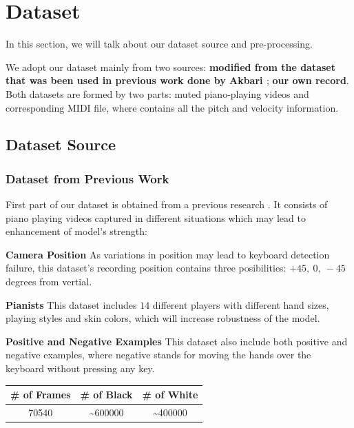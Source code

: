 \documentclass[10pt,twocolumn,letterpaper]{article}
\begin{document}
\section{Dataset}

   In this section, we will talk about our dataset source and pre-processing.

   We adopt our dataset mainly from two sources: \textbf{modified from the dataset that was been used in previous work done by Akbari \cite{Akbari}}; \textbf{our own record}.
   Both datasets are formed by two parts: muted piano-playing videos and corresponding MIDI file, where contains all the pitch and velocity information.

\subsection{Dataset Source}

   \subsubsection{Dataset from Previous Work}

   First part of our dataset is obtained from a previous research \cite{Akbari}. It consists of piano playing videos captured in different situations which may lead to enhancement of model's strength:

   \textbf{Camera Position} As variations in position may lead to keyboard detection failure, this dataset's recording position contains three posibilities: $+45,\ 0,\ -45$ degrees from vertial.

   \textbf{Pianists} This dataset includes $14$ different players with different hand sizes, playing styles and skin colors, which will increase robustness of the model.

   \textbf{Positive and Negative Examples} This dataset also include both positive and negative examples, where negative stands for moving the hands over the keyboard without pressing any key.\\
   
   \begin{minipage}{0.9\linewidth}
      \centering
   \begin{tabular}{ccc}
      \toprule
      \# of Frames&\# of Black&\# of White\\
      \midrule
      70540&\sim600000&\sim400000\\
      \bottomrule
      \end{tabular}
       \label{tab:prevdataset} 
   \end{minipage}
      
\end{document}
